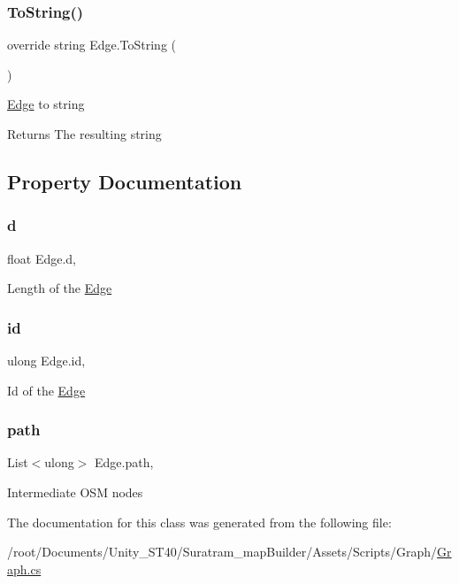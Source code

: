 \subsubsection{\texorpdfstring{To\+String()}{ToString()}}
{\footnotesize\ttfamily override string Edge.\+To\+String (\begin{DoxyParamCaption}{ }\end{DoxyParamCaption})}



\hyperlink{classEdge}{Edge} to string 

\begin{DoxyReturn}{Returns}
The resulting string
\end{DoxyReturn}


\subsection{Property Documentation}
\mbox{\label{classEdge_ac641179c0f3b7387c98e1bd6386869df}} 
\subsubsection{\texorpdfstring{d}{d}}
{\footnotesize\ttfamily float Edge.\+d\hspace{0.3cm}{\ttfamily [get]}, {\ttfamily [set]}}



Length of the \hyperlink{classEdge}{Edge}

\mbox{\label{classEdge_ab6636388f33f71927f8b48f2444e2461}} 
\subsubsection{\texorpdfstring{id}{id}}
{\footnotesize\ttfamily ulong Edge.\+id\hspace{0.3cm}{\ttfamily [get]}, {\ttfamily [set]}}



Id of the \hyperlink{classEdge}{Edge}

\mbox{\label{classEdge_a60f58b7cc5e9f00c8695fce3047933d8}} 
\subsubsection{\texorpdfstring{path}{path}}
{\footnotesize\ttfamily List$<$ulong$>$ Edge.\+path\hspace{0.3cm}{\ttfamily [get]}, {\ttfamily [set]}}



Intermediate O\+SM nodes



The documentation for this class was generated from the following file\+:\begin{DoxyCompactItemize}
\item 
/root/\+Documents/\+Unity\+\_\+\+S\+T40/\+Suratram\+\_\+map\+Builder/\+Assets/\+Scripts/\+Graph/\hyperlink{Graph_8cs}{Graph.\+cs}\end{DoxyCompactItemize}

